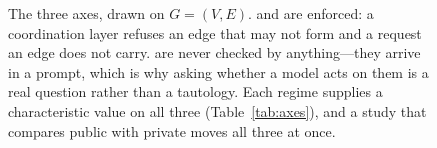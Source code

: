 \begin{figure}[t]
\caption{The three axes, drawn on $G=(V,E)$.  and  are
enforced: a coordination layer refuses an edge that may not form and a request an edge does
not carry.  are never checked by anything---they arrive in a prompt, which
is why asking whether a model acts on them is a real question rather than a tautology. Each
regime supplies a characteristic value on all three (Table~\ref{tab:axes}), and a study that
compares public with private moves all three at once.}
\label{fig:axes}
\end{figure}
